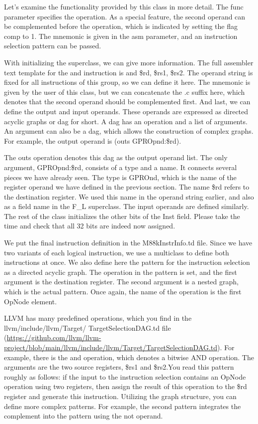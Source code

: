 Let’s examine the functionality provided by this class in more detail. The func parameter specifies the operation. As a special feature, the second operand can be complemented before the operation, which is indicated by setting the flag comp to 1. The mnemonic is given in the asm parameter, and an instruction selection pattern can be passed.

With initializing the superclass, we can give more information. The full assembler text template for the and instruction is and \$rd, \$rs1, \$rs2. The operand string is fixed for all instructions of this group, so we can define it here. The mnemonic is given by the user of this class, but we can concatenate the .c suffix here, which denotes that the second operand should be complemented first. And last, we can define the output and input operands. These operands are expressed as directed acyclic graphs or dag for short. A dag has an operation and a list of arguments. An argument can also be a dag, which allows the construction of complex graphs. For example, the output operand is (outs GPROpnd:\$rd).

The outs operation denotes this dag as the output operand list. The only argument, GPROpnd:\$rd, consists of a type and a name. It connects several pieces we have already seen. The type is GPROnd, which is the name of the register operand we have defined in the previous section. The name \$rd refers to the destination register. We used this name in the operand string earlier, and also as a field name in the F\_L superclass. The input operands are defined similarly. The rest of the class initializes the other bits of the Inst field. Please take the time and check that all 32 bits are indeed now assigned.

We put the final instruction definition in the M88kInstrInfo.td file. Since we have two variants of each logical instruction, we use a multiclass to define both instructions at once. We also define here the pattern for the instruction selection as a directed acyclic graph. The operation in the pattern is set, and the first argument is the destination register. The second argument is a nested graph, which is the actual pattern. Once again, the name of the operation is the first OpNode element.

LLVM has many predefined operations, which you find in the llvm/include/llvm/Target/ TargetSelectionDAG.td file (\url{https://github.com/llvm/llvm-project/blob/main/llvm/include/llvm/Target/TargetSelectionDAG.td}). For example, there is the and operation, which denotes a bitwise AND operation. The arguments are the two source registers, \$rs1 and \$rs2.You read this pattern roughly as follows: if the input to the instruction selection contains an OpNode operation using two registers, then assign the result of this operation to the \$rd register and generate this instruction. Utilizing the graph structure, you can define more complex patterns. For example, the second pattern integrates the complement into the pattern using the not operand.

